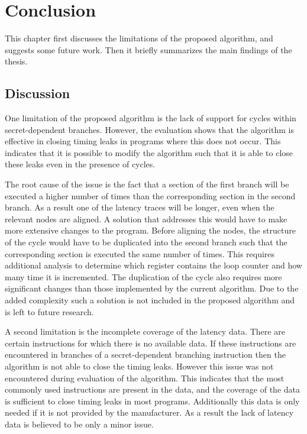 \chapter{Conclusion}
\label{cha:conclusion}
This chapter first discusses the limitations of the proposed algorithm, and suggests some future work. Then it briefly summarizes the main findings of the thesis. 

\section{Discussion}
One limitation of the proposed algorithm is the lack of support for cycles within secret-dependent branches.
However, the evaluation shows that the algorithm is effective in closing timing leaks in programs where this does not occur. 
This indicates that it is possible to modify the algorithm such that it is able to close these leaks even in the presence of cycles. 

The root cause of the issue is the fact that a section of the first branch will be executed a higher number of times than the corresponding section in the second branch. 
As a result one of the latency traces will be longer, even when the relevant nodes are aligned.
A solution that addresses this would have to make more extensive changes to the program. 
Before aligning the nodes, the structure of the cycle would have to be duplicated into the second branch such that the corresponding section is executed the same number of times. 
This requires additional analysis to determine which register contains the loop counter and how many time it is incremented. 
The duplication of the cycle also requires more significant changes than those implemented by the current algorithm.
Due to the added complexity such a solution is not included in the proposed algorithm and is left to future research. 

A second limitation is the incomplete coverage of the latency data. There are certain instructions for which there is no available data. 
If these instructions are encountered in branches of  a secret-dependent branching instruction then the algorithm is not able to close the timing leaks. 
However this issue was not encountered during evaluation of the algorithm. 
This indicates that the most commonly used instructions are present in the data, and the coverage of the data is sufficient to close timing leaks in most programs. 
Additionally this data is only needed if it is not provided by the manufacturer. 
As a result the lack of latency data is believed to be only a minor issue.  

